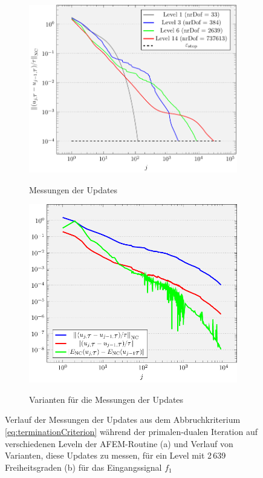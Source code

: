 \begin{figure}[p]
  \centering
  \begin{subfigure}[b]{.5\linewidth}
    \centering
    \caption{Messungen der Updates}
    \includegraphics[width=\linewidth]
      {pictures/chapExperiments/secIterProps/lvlWise/termLvl.pdf}
    \label{fig:iterationLevel}
  \end{subfigure}
  \quad
  \begin{subfigure}[b]{.46\linewidth}
    \centering
    \caption{Varianten für die Messungen der Updates }
    \includegraphics[width=\linewidth]
      {pictures/chapExperiments/secIterProps/lvlWise/termComp.pdf}
    \label{fig:iterationTerminationVariants}
  \end{subfigure}
  \caption{Verlauf der Messungen der Updates aus dem Abbruchkriterium 
    \eqref{eq:terminationCriterion} während der primalen-dualen Iteration auf
    verschiedenen Leveln der AFEM-Routine (a) und Verlauf von Varianten, diese
    Updates zu messen, für ein Level mit 2\,639 Freiheitsgraden (b) für das
    Eingangssignal $f_1$}
  \label{fig:iterationTermination}
\end{figure}
